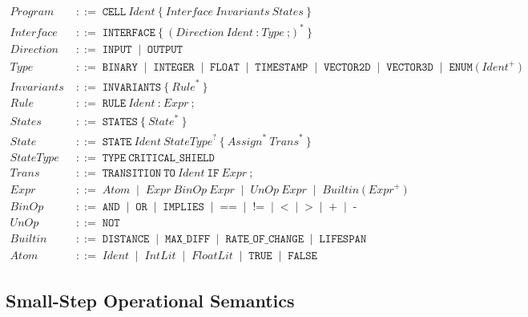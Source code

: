 \documentclass[11pt,a4paper,twoside]{article}
\newcommand{\nt}[1]{\textit{#1}}
\newcommand{\tm}[1]{\texttt{#1}}
\newcommand{\bnfor}{\;\mid\;}
\newcommand{\bnfdef}{\;{::=}\;}
\begin{document}
\vspace{4pt}
\begin{align*}
\nt{Program}   &\bnfdef \tm{CELL}\ \nt{Ident}\ \tm{\{}\ \nt{Interface}\ \nt{Invariants}\ \nt{States}\ \tm{\}} \\[3pt]
\nt{Interface}  &\bnfdef \tm{INTERFACE}\ \tm{\{}\ (\nt{Direction}\ \nt{Ident}\ \tm{:}\ \nt{Type}\ \tm{;})^*\ \tm{\}} \\
\nt{Direction}  &\bnfdef \tm{INPUT} \bnfor \tm{OUTPUT} \\
\nt{Type}       &\bnfdef \tm{BINARY} \bnfor \tm{INTEGER} \bnfor \tm{FLOAT}
                          \bnfor \tm{TIMESTAMP} \bnfor \tm{VECTOR2D}
                          \bnfor \tm{VECTOR3D} \bnfor \tm{ENUM}\ \tm{(}\ \nt{Ident}^+\ \tm{)} \\[3pt]
\nt{Invariants} &\bnfdef \tm{INVARIANTS}\ \tm{\{}\ \nt{Rule}^*\ \tm{\}} \\
\nt{Rule}       &\bnfdef \tm{RULE}\ \nt{Ident}\ \tm{:}\ \nt{Expr}\ \tm{;} \\[3pt]
\nt{States}     &\bnfdef \tm{STATES}\ \tm{\{}\ \nt{State}^*\ \tm{\}} \\
\nt{State}      &\bnfdef \tm{STATE}\ \nt{Ident}\ \nt{StateType}^?\ \tm{\{}\ \nt{Assign}^*\ \nt{Trans}^*\ \tm{\}} \\
\nt{StateType}  &\bnfdef \tm{TYPE}\ \tm{CRITICAL\_SHIELD} \\
\nt{Trans}      &\bnfdef \tm{TRANSITION}\ \tm{TO}\ \nt{Ident}\ \tm{IF}\ \nt{Expr}\ \tm{;} \\[3pt]
\nt{Expr}       &\bnfdef \nt{Atom} \bnfor \nt{Expr}\ \nt{BinOp}\ \nt{Expr}
                          \bnfor \nt{UnOp}\ \nt{Expr}
                          \bnfor \nt{Builtin}\ \tm{(}\ \nt{Expr}^+\ \tm{)} \\
\nt{BinOp}      &\bnfdef \tm{AND} \bnfor \tm{OR} \bnfor \tm{IMPLIES}
                          \bnfor \tm{==} \bnfor \tm{!=} \bnfor \tm{<}
                          \bnfor \tm{>} \bnfor \tm{+} \bnfor \tm{-} \\
\nt{UnOp}       &\bnfdef \tm{NOT} \\
\nt{Builtin}    &\bnfdef \tm{DISTANCE} \bnfor \tm{MAX\_DIFF}
                          \bnfor \tm{RATE\_OF\_CHANGE} \bnfor \tm{LIFESPAN} \\
\nt{Atom}       &\bnfdef \nt{Ident} \bnfor \nt{IntLit} \bnfor \nt{FloatLit}
                          \bnfor \tm{TRUE} \bnfor \tm{FALSE}
\end{align*}

\subsection{Small-Step Operational Semantics}
\end{document}
